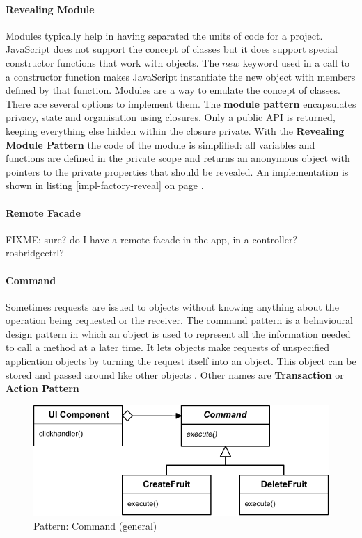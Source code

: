 \paragraph{Revealing Module} \cite{Osmani:2012} Modules typically help in having separated the units of code for a project.
JavaScript does not support the concept of classes but it does support special constructor functions that work with objects. 
The $new$ keyword used in a call to a constructor function makes JavaScript instantiate the new object with members defined by that function.
Modules are a way to emulate the concept of classes.
There are several options to implement them.
The \textbf{module pattern} encapsulates privacy, state and organisation using closures.
Only a public \ac{API} is returned, keeping everything else hidden within the closure private.
With the \textbf{Revealing Module Pattern} the code of the module is simplified: all variables and functions are defined in the private scope and returns an anonymous object with pointers to the private properties that should be revealed.
An implementation is shown in listing \ref{impl-factory-reveal} on page \pageref{impl-factory-reveal}.

\paragraph{Remote Facade} FIXME: sure? do I have a remote facade in the app, in a controller? rosbridgectrl?

\paragraph{Command} 
Sometimes requests are issued to objects without knowing anything about the operation being requested or the receiver.
The command pattern is a behavioural design pattern in which an object is used to represent all the information needed to call a method at a later time. 
It lets objects make requests of unspecified application objects by turning the request itself into an object.
This object can be stored and passed around like other objects \cite{GoF:1995}.
Other names are \textbf{Transaction} or \textbf{Action Pattern}  

\begin{figure}[htb]
    \centering
    \includegraphics{figures/design-patterns-command-1.pdf}
    \caption{Pattern: Command (general)}
    \label{fig:design-command-general}
\end{figure}

